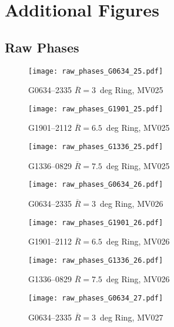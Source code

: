 \clearpage
\section{Additional Figures} \label{app3:figures}
	\subsection{Raw Phases}

			\begin{figure}[H]
				\centering
				\texttt{[image: raw\_phases\_G0634\_25.pdf]}
				\caption[G0634--2335 MV025 Phases]{G0634--2335 $\overline{R}=3$~deg Ring, MV025}
			\end{figure}
			
			\begin{figure}[h]
				\centering
				\texttt{[image: raw\_phases\_G1901\_25.pdf]}
				\caption[G1901--2112 MV025 Phases]{G1901--2112 $\overline{R}=6.5$~deg Ring, MV025}
			\end{figure}
			
			\begin{figure}[h]
				\centering
				\texttt{[image: raw\_phases\_G1336\_25.pdf]}
				\caption[G1336--0829 MV025 Phases]{G1336--0829 $\overline{R}=7.5$~deg Ring, MV025}
			\end{figure}
			
			
			\begin{figure}[h]
				\centering
				\texttt{[image: raw\_phases\_G0634\_26.pdf]}
				\caption[G0634--2335 MV026 Phases]{G0634--2335 $\overline{R}=3$~deg Ring, MV026}
			\end{figure}
			
			\begin{figure}[h]
				\centering
				\texttt{[image: raw\_phases\_G1901\_26.pdf]}
				\caption[G1901--2112 MV026 Phases]{G1901--2112 $\overline{R}=6.5$~deg Ring, MV026}
			\end{figure}
			
			\begin{figure}[h]
				\centering
				\texttt{[image: raw\_phases\_G1336\_26.pdf]}
				\caption[G1336--0829 MV026 Phases]{G1336--0829 $\overline{R}=7.5$~deg Ring, MV026}
			\end{figure}
			
			
			\begin{figure}[h]
				\centering
				\texttt{[image: raw\_phases\_G0634\_27.pdf]}
				\caption[G0634--2335 MV027 Phases]{G0634--2335 $\overline{R}=3$~deg Ring, MV027}
			\end{figure}
			
